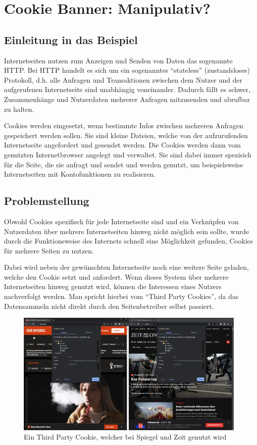 \section{Cookie Banner: Manipulativ?}
\subsection{Einleitung in das Beispiel}
Internetseiten nutzen zum Anzeigen und Senden von Daten das sogenannte \ac{HTTP}. Bei \ac{HTTP} handelt es sich um ein sogenanntes ``stateless'' (zustandsloses) Protokoll, d.h. alle Anfragen und Transaktionen zwischen dem Nutzer und der aufgerufenen Internetseite sind unabhängig voneinander. Dadurch fällt es schwer, Zusammenhänge und Nutzerdaten mehrerer Anfragen mitzusenden und abrufbar zu halten.

Cookies werden eingesetzt, wenn bestimmte Infos zwischen mehreren Anfragen gespeichert werden sollen. Sie sind kleine Dateien, welche von der aufzurufenden Internetseite angefordert und gesendet werden. Die Cookies werden dann vom genutzten Internetbrowser angelegt und verwaltet. Sie sind dabei immer spezisich für die Seite, die sie anfragt und sendet und werden genutzt, um beispielsweise Internetseiten mit Kontofunktionen zu realisieren. 

\subsection{Problemstellung}
Obwohl Cookies spezifisch für jede Internetseite sind und ein Verknüpfen von Nutzerdaten über mehrere Internetseiten hinweg nicht möglich sein sollte, wurde durch die Funktionsweise des Internets schnell eine Möglichkeit gefunden, Cookies für mehrere Seiten zu nutzen.

Dabei wird neben der gewünschten Internetseite noch eine weitere Seite geladen, welche den Cookie setzt und anfordert. Wenn dieses System über mehrere Internetseiten hinweg genutzt wird, können die Interessen eines Nutzers nachverfolgt werden. Man spricht hierbei vom ``Third Party Cookies'', da das Datensammeln nicht direkt durch den Seitenbetreiber selbst passiert. 

\begin{figure}[ht]
	\centering
	\includegraphics[width=1\textwidth]{Bilder/Cookies.png} 
	\caption{Ein Third Party Cookie, welcher bei Spiegel und Zeit genutzt wird}
	\label{fig:Third-Party}
\end{figure}

